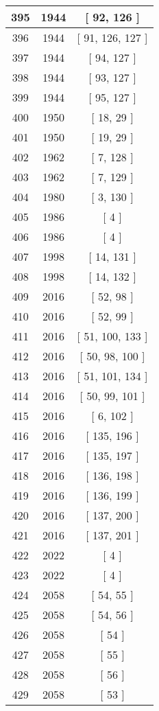 \begin{center}
\begin{longtable}[H]{|| c c c ||}
\hline
395 & 1944 & [ 92, 126 ] \\ 
\hline
396 & 1944 & [ 91, 126, 127 ] \\ 
\hline
397 & 1944 & [ 94, 127 ] \\ 
\hline
398 & 1944 & [ 93, 127 ] \\ 
\hline
399 & 1944 & [ 95, 127 ] \\ 
\hline
400 & 1950 & [ 18, 29 ] \\ 
\hline
401 & 1950 & [ 19, 29 ] \\ 
\hline
402 & 1962 & [ 7, 128 ] \\ 
\hline
403 & 1962 & [ 7, 129 ] \\ 
\hline
404 & 1980 & [ 3, 130 ] \\ 
\hline
405 & 1986 & [ 4 ] \\ 
\hline
406 & 1986 & [ 4 ] \\ 
\hline
407 & 1998 & [ 14, 131 ] \\ 
\hline
408 & 1998 & [ 14, 132 ] \\ 
\hline
409 & 2016 & [ 52, 98 ] \\ 
\hline
410 & 2016 & [ 52, 99 ] \\ 
\hline
411 & 2016 & [ 51, 100, 133 ] \\ 
\hline
412 & 2016 & [ 50, 98, 100 ] \\ 
\hline
413 & 2016 & [ 51, 101, 134 ] \\ 
\hline
414 & 2016 & [ 50, 99, 101 ] \\ 
\hline
415 & 2016 & [ 6, 102 ] \\ 
\hline
416 & 2016 & [ 135, 196 ] \\ 
\hline
417 & 2016 & [ 135, 197 ] \\ 
\hline
418 & 2016 & [ 136, 198 ] \\ 
\hline
419 & 2016 & [ 136, 199 ] \\ 
\hline
420 & 2016 & [ 137, 200 ] \\ 
\hline
421 & 2016 & [ 137, 201 ] \\ 
\hline
422 & 2022 & [ 4 ] \\ 
\hline
423 & 2022 & [ 4 ] \\ 
\hline
424 & 2058 & [ 54, 55 ] \\ 
\hline
425 & 2058 & [ 54, 56 ] \\ 
\hline
426 & 2058 & [ 54 ] \\ 
\hline
427 & 2058 & [ 55 ] \\ 
\hline
428 & 2058 & [ 56 ] \\ 
\hline
429 & 2058 & [ 53 ] \\ 

\end{longtable}
\end{center}
